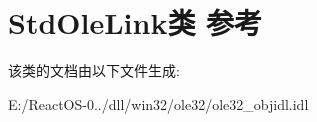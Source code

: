 \hypertarget{class_std_ole_link}{}\section{Std\+Ole\+Link类 参考}
\label{class_std_ole_link}


该类的文档由以下文件生成\+:\begin{DoxyCompactItemize}
\item 
E\+:/\+React\+O\+S-\/0../dll/win32/ole32/ole32\+\_\+objidl.\+idl\end{DoxyCompactItemize}

